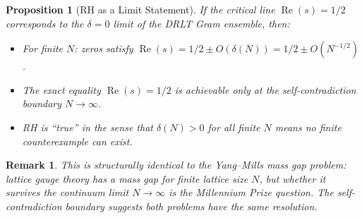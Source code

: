 \documentclass[11pt]{article}
\newtheorem{proposition}[theorem]{Proposition}
\newtheorem{remark}[theorem]{Remark}
\begin{document}
\begin{proposition}[RH as a Limit Statement]
If the critical line $\operatorname{Re}(s) = 1/2$ corresponds to
the $\delta = 0$ limit of the DRLT Gram ensemble, then:
\begin{itemize}
  \item For finite $N$: zeros satisfy
    $\operatorname{Re}(s) = 1/2 \pm O(\delta(N)) = 1/2 \pm O(N^{-1/2})$.
  \item The exact equality $\operatorname{Re}(s) = 1/2$ is achievable
    only at the self-contradiction boundary $N \to \infty$.
  \item RH is ``true'' in the sense that $\delta(N) > 0$ for all finite $N$
    means no finite counterexample can exist.
\end{itemize}
\end{proposition}

\begin{remark}
This is structurally identical to the Yang--Mills mass gap problem:
lattice gauge theory has a mass gap for finite lattice size $N$,
but whether it survives the continuum limit $N \to \infty$
is the Millennium Prize question. The self-contradiction boundary
suggests both problems have the same resolution.
\end{remark}
\end{document}
